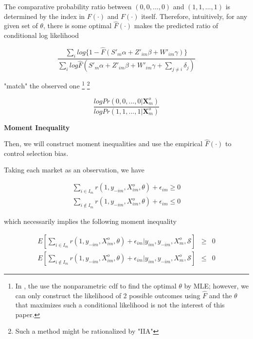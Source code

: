 \documentclass[draft]{article}
\begin{document}
The comparative probability ratio between $(0,0,...,0)$ and $(1, 1, ..., 1)$ is determined by the index in $F(\cdot)$ and $F(\cdot)$ itself. Therefore, intuitively, for any given set of $\theta$, there is some optimal $\hat{F}(\cdot)$ makes the predicted ratio of conditional log likelihood 

$$\dfrac{\sum_i log \{1 - \hat{F}(S'_m\alpha+Z'_{im}\beta+W'_{im}\gamma)\}}{\sum_i log \hat{F}(S'_m\alpha+Z'_{im}\beta+W'_{im}\gamma + \sum_{j\neq i}\delta_{j})}$$

"match" the observed one \footnote{In \cite{cosslett1983distribution}, the use the nonparametric cdf to find the optimal $\theta$ by MLE; however, we can only construct the likelihood of 2 possible outcomes using $\hat{F}$ and the $\theta$ that maximizes such a conditional likelihood is not the interest of this paper.}
\footnote{Such a method might be rationalized by "IIA"}

$$\dfrac{log Pr(0,0,...,0|\textbf{X}^o_m) }{log Pr(1,1,...,1|\textbf{X}^o_m)}$$




\bigskip

\textbf{Moment Inequality}

\bigskip

Then, we will construct moment inequalities and use the empirical $\hat{F}(\cdot)$ to control selection bias.

\bigskip

Taking each market as an observation, we have

\begin{equation}
\begin{array}{rcl}
\displaystyle \sum_{i \in I_m} r(1,y_{-im},X^o_{im},\theta)+ \epsilon_{im} \geq 0\\
\displaystyle \sum_{i \not\in I_m} r(1,y_{-im},X^o_{im},\theta)+ \epsilon_{im} \leq 0
\end{array}
\label{ineq_uncon}
\end{equation}


which necessarily implies the following moment inequality

\begin{equation}
\begin{array}{rcl}
E[\displaystyle \sum_{i \in I_m} r(1,y_{-im},X^o_{im},\theta)+ \epsilon_{im} | y_{im}, y_{-im}, X^o_{m},\mathcal{S}] &\geq& 0 \\ 
E[\displaystyle \sum_{i \not\in I_m} r(1,y_{-im},X^o_{im},\theta)+ \epsilon_{im} |y_{im}, y_{-im}, X^o_{m}, \mathcal{S}] &\leq& 0 
\end{array}
\nonumber
\end{equation}
\end{document}
